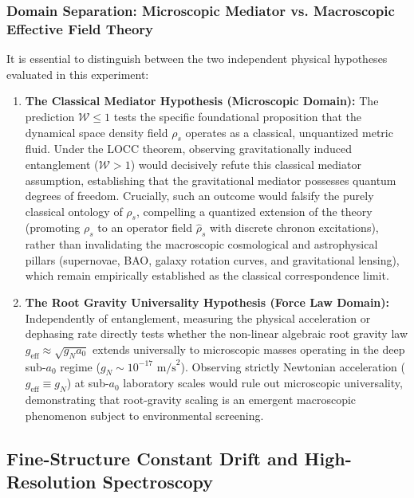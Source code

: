 \documentclass[aps,prd,reprint,superscriptaddress,nofootinbib,twocolumn,floatfix]{revtex4-2}
\begin{document}
\subsubsection{Domain Separation: Microscopic Mediator vs. Macroscopic Effective Field Theory}
It is essential to distinguish between the two independent physical hypotheses evaluated in this experiment:
\begin{enumerate}\setlength{\itemsep}{1pt}\setlength{\parskip}{0pt}
    \item \textbf{The Classical Mediator Hypothesis (Microscopic Domain):} The prediction $\mathcal{W} \le 1$ tests the specific foundational proposition that the dynamical space density field $\rho_s$ operates as a classical, unquantized metric fluid. Under the LOCC theorem, observing gravitationally induced entanglement ($\mathcal{W} > 1$) would decisively refute this classical mediator assumption, establishing that the gravitational mediator possesses quantum degrees of freedom. Crucially, such an outcome would falsify the purely classical ontology of $\rho_s$, compelling a quantized extension of the theory (promoting $\rho_s$ to an operator field $\hat{\rho}_s$ with discrete chronon excitations), rather than invalidating the macroscopic cosmological and astrophysical pillars (supernovae, BAO, galaxy rotation curves, and gravitational lensing), which remain empirically established as the classical correspondence limit.
    \item \textbf{The Root Gravity Universality Hypothesis (Force Law Domain):} Independently of entanglement, measuring the physical acceleration or dephasing rate directly tests whether the non-linear algebraic root gravity law $g_{\text{eff}} \approx \sqrt{g_N a_0}$ extends universally to microscopic masses operating in the deep sub-$a_0$ regime ($g_N \sim 10^{-17}\text{ m/s}^2$). Observing strictly Newtonian acceleration ($g_{\text{eff}} \equiv g_N$) at sub-$a_0$ laboratory scales would rule out microscopic universality, demonstrating that root-gravity scaling is an emergent macroscopic phenomenon subject to environmental screening.
\end{enumerate}

\subsection{Fine-Structure Constant Drift and High-Resolution Spectroscopy}
\label{sec:fine_structure}
\end{document}
